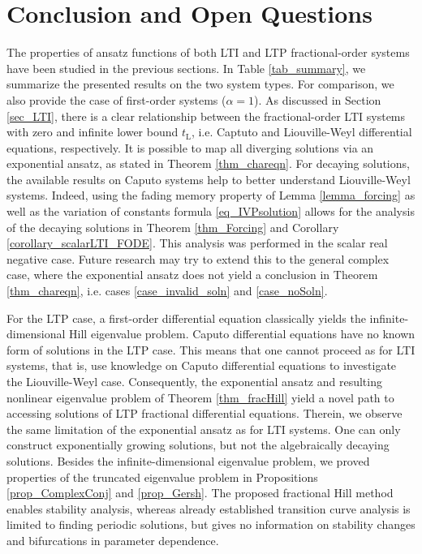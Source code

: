 \documentclass{svproc}
\begin{document}
		\section{Conclusion and Open Questions}\label{sec_outlook}
		{The properties of ansatz functions of both LTI and LTP fractional-order systems have been studied in the previous sections. In Table \ref{tab_summary}, we summarize the presented results on the two system types. For comparison, we also provide the case of first-order systems ($\alpha = 1$). As discussed in Section \ref{sec_LTI}, there is a clear relationship between the fractional-order LTI systems with zero and infinite lower bound $t_\mathrm L$, i.e. Captuto and Liouville-Weyl differential equations, respectively. It is possible to map all diverging solutions via an exponential ansatz, as stated in Theorem \ref{thm_chareqn}. For decaying solutions, the available results on Caputo systems help to better understand Liouville-Weyl systems. Indeed, using the fading memory property of Lemma \ref{lemma_forcing} as well as the variation of constants formula \eqref{eq_IVPsolution} allows for the analysis of the decaying solutions in Theorem \ref{thm_Forcing} and Corollary \ref{corollary_scalarLTI_FODE}. This analysis was performed in the scalar real negative case. Future research may try to extend this to the general complex case, where the exponential ansatz does not yield a conclusion in Theorem \ref{thm_chareqn}, i.e. cases \ref{case_invalid_soln} and \ref{case_noSoln}. 
			
		For the LTP case, a first-order differential equation classically yields the infinite-dimensional Hill eigenvalue problem. Caputo differential equations have no known form of solutions in the LTP case. This means that one cannot proceed as for LTI systems, that is, use knowledge on Caputo differential equations to investigate the Liouville-Weyl case. Consequently, the exponential ansatz and resulting nonlinear eigenvalue problem of Theorem \ref{thm_fracHill} yield a novel path to accessing solutions of LTP fractional differential equations. Therein, we observe the same limitation of the exponential ansatz as for LTI systems. One can only construct exponentially growing solutions, but not the algebraically decaying solutions. Besides the infinite-dimensional eigenvalue problem, we proved properties of the truncated eigenvalue problem in Propositions \ref{prop_ComplexConj} and \ref{prop_Gersh}. The proposed fractional Hill method enables stability analysis, whereas already established transition curve analysis is limited to finding periodic solutions, but gives no information on stability changes and bifurcations in parameter dependence.
		
}
\end{document}
